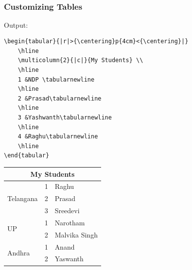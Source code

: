 \documentclass[12pt]{beamer}
\begin{document}
\begin{frame}[fragile]
\section{         }
\frametitle{Customizing Tables  }
Output:\\
\begin{verbatim}
\begin{tabular}{|r|>{\centering}p{4cm}<{\centering}|}
	\hline
	\multicolumn{2}{|c|}{My Students} \\
	\hline
	1 &NDP \tabularnewline	
	\hline
	2 &Prasad\tabularnewline
	\hline		
	3 &Yashwanth\tabularnewline
	\hline	
	4 &Raghu\tabularnewline
	\hline
\end{tabular}
\end{verbatim}
\end{frame}

\begin{frame}
\begin{tabular}{|l|r|>{\centering}p{4cm}<{\centering}|}
	\hline
	\multicolumn{3}{|c|}{My Students} \tabularnewline
	\hline
	\multirow{3}{*}{Telangana} 	& 1 & Raghu \tabularnewline
								& 2 & Prasad \tabularnewline
								& 3 & Sreedevi \tabularnewline
								\hline
	\multirow{2}{*}{UP} 		& 1 & Narotham \tabularnewline
								& 2 & Malvika Singh \tabularnewline 
								\hline
	\multirow{2}{*}{Andhra} 	& 1 & Anand \tabularnewline
								& 2 & Yaswanth \tabularnewline
								\hline
\end{tabular}
\end{frame}
\end{document}
